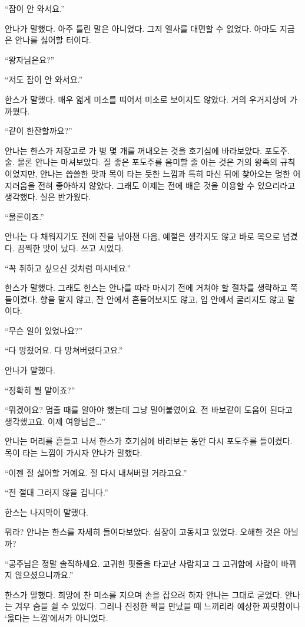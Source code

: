 ``잠이 안 와서요.''

안나가 말했다. 아주 틀린 말은 아니었다. 그저 엘사를 대면할 수 없었다. 아마도 지금은 안나를 싫어할 터이다.

``왕자님은요?''

``저도 잠이 안 와서요.''

한스가 말했다. 매우 엷게 미소를 띠어서 미소로 보이지도 않았다. 거의 우거지상에 가까웠다.

``같이 한잔할까요?''

안나는 한스가 저장고로 가 병 몇 개를 꺼내오는 것을 호기심에 바라보았다. 포도주. 술. 물론 안나는 마셔보았다. 질 좋은 포도주를 음미할 줄 아는 것은 거의 왕족의 규칙이었지만, 안나는 씁쓸한 맛과 목이 타는 듯한 느낌과 특히 마신 뒤에 찾아오는 멍한 어지러움을 전혀 좋아하지 않았다. 그래도 이제는 전에 배운 것을 이용할 수 있으리라고 생각했다. 실은 반가웠다.

``물론이죠.''

안나는 다 채워지기도 전에 잔을 낚아챈 다음, 예절은 생각지도 않고 바로 목으로 넘겼다. 끔찍한 맛이 났다. 쓰고 시었다.

``꼭 취하고 싶으신 것처럼 마시네요.''

한스가 말했다. 그래도 한스는 안나를 따라 마시기 전에 거쳐야 할 절차를 생략하고 쭉 들이켰다. 향을 맡지 않고, 잔 안에서 흔들어보지도 않고, 입 안에서 굴리지도 않고 말이다.

``무슨 일이 있었나요?''

``다 망쳤어요. 다 망쳐버렸다고요.''

안나가 말했다.

``정확히 뭘 말이죠?''

``뭐겠어요? 멈출 때를 알아야 했는데 그냥 밀어붙였어요. 전 바보같이 도움이 된다고 생각했고요. 이제 여왕님은\ldots''

안나는 머리를 흔들고 나서 한스가 호기심에 바라보는 동안 다시 포도주를 들이켰다. 목이 타는 느낌이 가시자 안나가 말했다.

``이젠 절 싫어할 거예요. 절 다시 내쳐버릴 거라고요.''

``전 절대 그러지 않을 겁니다.''

한스는 나지막이 말했다.

뭐라? 안나는 한스를 자세히 들여다보았다. 심장이 고동치고 있었다. 오해한 것은 아닐까?

``공주님은 정말 솔직하세요. 고귀한 핏줄을 타고난 사람치고 그 고귀함에 사람이 바뀌지 않으셨으니까요.''

한스가 말했다. 희망에 찬 미소를 지으며 손을 잡으려 하자 안나는 그대로 굳었다. 안나는 겨우 숨을 쉴 수 있었다. 그러나 진정한 짝을 만났을 때 느끼리라 예상한 짜릿함이나 `옳다는 느낌'에서가 아니었다.

